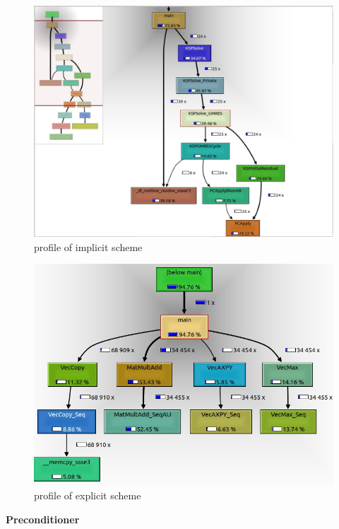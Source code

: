 \documentclass[a4paper,10pt]{article}
\begin{document}
\begin{figure}[h]
	\centering
	\includegraphics[scale=0.35]{profile_implicit.jpg}
	\caption{profile of implicit scheme}
\end{figure}
\begin{figure}[h]
	\centering
	\includegraphics[scale=0.35]{profile_explicit.jpg}
	\caption{profile of explicit scheme}
\end{figure}

\clearpage
\large \textbf {Preconditioner}
\end{document}
